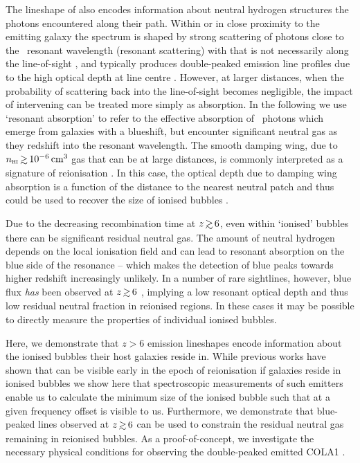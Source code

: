 \documentclass[fleqn,usenatbib]{mnras}
\begin{document}
The lineshape of \lya also encodes information about neutral hydrogen structures the photons encountered along their path. Within or in close proximity to the emitting galaxy the \lya spectrum is shaped by strong scattering of photons close to the \lya\ resonant wavelength (resonant scattering) with \HI that is not necessarily along the line-of-sight \citep{Eide2018}, and typically produces double-peaked emission line profiles due to the high optical depth at line centre \citep[e.g.,][]{Neufeld1990}. However, at larger distances, when the probability of scattering back into the line-of-sight becomes negligible, the impact of intervening \HI can be treated more simply as absorption. In the following we use `resonant absorption' to refer to the effective absorption of \lya\ photons which emerge from galaxies with a blueshift, but encounter significant neutral gas as they redshift into the resonant wavelength.
The smooth damping wing, due to $n_{\HI} \simgt 10^{-6} \cm^3$ gas that can be at large distances, is commonly interpreted as a signature of reionisation \citep[ e.g.,][]{Miralda-Escude1998}. In this case, the optical depth due to damping wing absorption is a function of the distance to the nearest neutral patch and thus could be used to recover the size of ionised bubbles \citep{Malhotra2006}. 

Due to the decreasing recombination time at $z\simgt6$, even within `ionised' bubbles there can be significant residual neutral gas. The amount of neutral hydrogen  depends on the local ionisation field and can lead to resonant absorption on the blue side of the \lya resonance \citep[e.g.,][]{Gunn1965,Zheng2010,Laursen2011,Byrohl2020} -- which makes the detection of blue \lya peaks towards higher redshift increasingly unlikely. In a number of rare sightlines, however, blue \lya flux \textit{has} been observed at $z\simgt6$ \citep{Matthee2018b,Songaila2018,Bosman2019}, implying a low resonant optical depth and thus low residual neutral fraction in reionised regions. In these cases it may be possible to directly measure the properties of individual ionised bubbles.

Here, we demonstrate that $z>6$ \lya emission lineshapes encode information about the ionised bubbles their host galaxies reside in. While previous works have shown that \lya can be visible early in the epoch of reionisation if galaxies reside in ionised bubbles \citep{Haiman2002,Mason2018b} we show here that spectroscopic measurements of such \lya emitters enable us to calculate the minimum size of the ionised bubble such that \lya at a given frequency offset is visible to us. 
Furthermore, we demonstrate that blue-peaked \lya lines observed at $z\simgt6$ can be used to constrain the residual neutral gas remaining in reionised bubbles. As a proof-of-concept, we investigate the necessary physical conditions for observing the double-peaked \lya emitted COLA1 \citep{Hu2016,Matthee2018b}.
\end{document}
